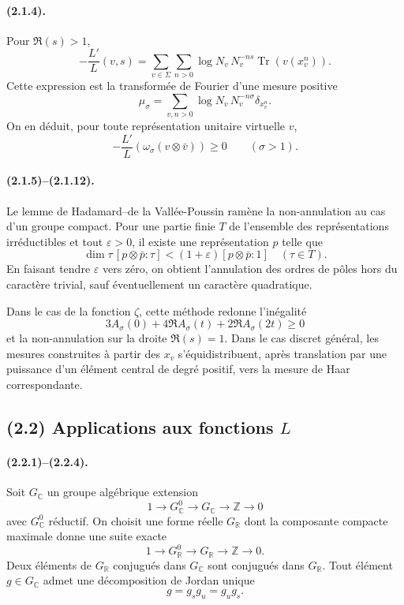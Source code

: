 \documentclass[11pt]{article}
\theoremstyle{remark}
\newcommand{\ZZ}{\mathbb{Z}}
\newcommand{\CC}{\mathbb{C}}
\newcommand{\RR}{\mathbb{R}}
\begin{document}
\paragraph{(2.1.4).}
Pour \(\Re(s)>1\),
\[
-\frac{L'}{L}(v,s)
 =
 \sum_{v\in\Sigma}\sum_{n>0}
 \log N_v\,N_v^{-ns}\operatorname{Tr}(v(x_v^n)).
\]
Cette expression est la transformée de Fourier d'une mesure positive
\[
\mu_\sigma=\sum_{v,n>0}\log N_v\,N_v^{-n\sigma}\delta_{x_v^n}.
\]
On en déduit, pour toute représentation unitaire virtuelle \(v\),
\[
-\frac{L'}{L}(\omega_\sigma(v\otimes\bar v))\ge0
\qquad(\sigma>1).
\]

\paragraph{(2.1.5)--(2.1.12).}
Le lemme de Hadamard--de la Vallée-Poussin ramène la non-annulation au cas d'un groupe compact. Pour une partie finie \(T\) de l'ensemble des représentations irréductibles et tout \(\varepsilon>0\), il existe une représentation \(p\) telle que
\[
\dim\tau\,[p\otimes\bar p:\tau]<(1+\varepsilon)[p\otimes\bar p:1]
\quad(\tau\in T).
\]
En faisant tendre \(\varepsilon\) vers zéro, on obtient l'annulation des ordres de pôles hors du caractère trivial, sauf éventuellement un caractère quadratique.

Dans le cas de la fonction \(\zeta\), cette méthode redonne l'inégalité
\[
3A_\sigma(0)+4\Re A_\sigma(t)+2\Re A_\sigma(2t)\ge0
\]
et la non-annulation sur la droite \(\Re(s)=1\). Dans le cas discret général, les mesures construites à partir des \(x_v\) s'équidistribuent, après translation par une puissance d'un élément central de degré positif, vers la mesure de Haar correspondante.

\subsection*{(2.2) Applications aux fonctions \(L\)}

\paragraph{(2.2.1)--(2.2.4).}
Soit \(G_\CC\) un groupe algébrique extension
\[
1\longrightarrow G^0_\CC\longrightarrow G_\CC\longrightarrow\ZZ\longrightarrow0
\]
avec \(G^0_\CC\) réductif. On choisit une forme réelle \(G_\RR\) dont la composante compacte maximale donne une suite exacte
\[
1\longrightarrow G^0_\RR\longrightarrow G_\RR\longrightarrow\ZZ\longrightarrow0.
\]
Deux éléments de \(G_\RR\) conjugués dans \(G_\CC\) sont conjugués dans \(G_\RR\). Tout élément \(g\in G_\CC\) admet une décomposition de Jordan unique
\[
g=g_sg_u=g_ug_s.
\]
\end{document}
